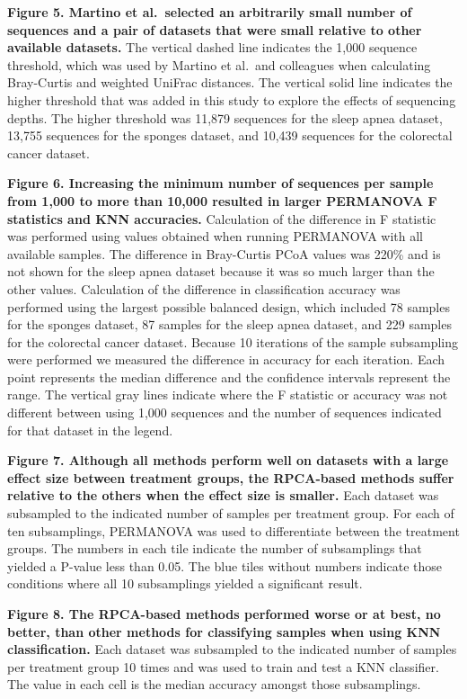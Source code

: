 \documentclass[
  11pt,
]{article}
\begin{document}
\textbf{Figure 5. Martino et al.~selected an arbitrarily small number of
sequences and a pair of datasets that were small relative to other
available datasets.} The vertical dashed line indicates the 1,000
sequence threshold, which was used by Martino et al.~and colleagues when
calculating Bray-Curtis and weighted UniFrac distances. The vertical
solid line indicates the higher threshold that was added in this study
to explore the effects of sequencing depths. The higher threshold was
11,879 sequences for the sleep apnea dataset, 13,755 sequences for the
sponges dataset, and 10,439 sequences for the colorectal cancer dataset.

\textbf{Figure 6. Increasing the minimum number of sequences per sample
from 1,000 to more than 10,000 resulted in larger PERMANOVA F statistics
and KNN accuracies.} Calculation of the difference in F statistic was
performed using values obtained when running PERMANOVA with all
available samples. The difference in Bray-Curtis PCoA values was 220\%
and is not shown for the sleep apnea dataset because it was so much
larger than the other values. Calculation of the difference in
classification accuracy was performed using the largest possible
balanced design, which included 78 samples for the sponges dataset, 87
samples for the sleep apnea dataset, and 229 samples for the colorectal
cancer dataset. Because 10 iterations of the sample subsampling were
performed we measured the difference in accuracy for each iteration.
Each point represents the median difference and the confidence intervals
represent the range. The vertical gray lines indicate where the F
statistic or accuracy was not different between using 1,000 sequences
and the number of sequences indicated for that dataset in the legend.

\textbf{Figure 7. Although all methods perform well on datasets with a
large effect size between treatment groups, the RPCA-based methods
suffer relative to the others when the effect size is smaller.} Each
dataset was subsampled to the indicated number of samples per treatment
group. For each of ten subsamplings, PERMANOVA was used to differentiate
between the treatment groups. The numbers in each tile indicate the
number of subsamplings that yielded a P-value less than 0.05. The blue
tiles without numbers indicate those conditions where all 10
subsamplings yielded a significant result.

\textbf{Figure 8. The RPCA-based methods performed worse or at best, no
better, than other methods for classifying samples when using KNN
classification.} Each dataset was subsampled to the indicated number of
samples per treatment group 10 times and was used to train and test a
KNN classifier. The value in each cell is the median accuracy amongst
those subsamplings.
\end{document}
